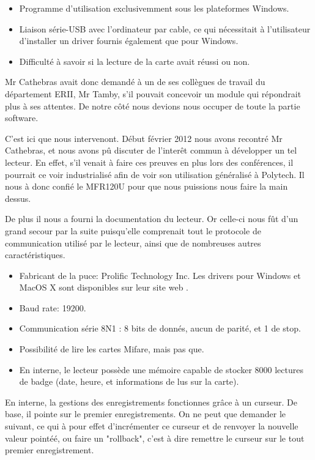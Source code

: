     \begin{itemize}
        \item Programme d'utilisation exclusivemment sous les plateformes Windows.
        \item Liaison série-USB avec l'ordinateur par cable, ce qui nécessitait 
              à l'utilisateur d'installer un driver fournis également que pour
              Windows.
        \item Difficulté à savoir si la lecture de la carte avait réussi ou non.
    \end{itemize}

    Mr Cathebras avait donc demandé à un de ses collègues de travail du département
ERII, Mr Tamby, s'il pouvait concevoir un module qui répondrait plus à ses attentes.
De notre côté nous devions nous occuper de toute la partie software.

    C'est ici que nous intervenont. Début février 2012 nous avons recontré Mr Cathebras,
et nous avons pû discuter de l'interêt commun à développer un tel lecteur. En effet,
s'il venait à faire ces preuves en plus lors des conférences, il pourrait ce voir
industrialisé afin de voir son utilisation généralisé à Polytech. Il nous à donc
confié le MFR120U pour que nous puissions nous faire la main dessus.


    De plus il nous a fourni la documentation du lecteur. Or celle-ci nous fût d'un
grand secour par la suite puisqu'elle comprenait tout le protocole de communication
utilisé par le lecteur, ainsi que de nombreuses autres caractéristiques.

    \begin{itemize}
        \item Fabricant de la puce: Prolific Technology Inc. Les drivers pour Windows
              et MacOS X sont disponibles sur leur site web \cite{prolific}.
        \item Baud rate: 19200.
        \item Communication série 8N1 : 8 bits de donnés, aucun de parité, et 1 de stop.
        \item Possibilité de lire les cartes Mifare, mais pas que.
        \item En interne, le lecteur possède une mémoire capable de stocker 8000
              lectures de badge (date, heure, et informations de lus sur la carte).
    \end{itemize}

    En interne, la gestions des enregistrements fonctionnes grâce à un curseur.
De base, il pointe sur le premier enregistrements. On ne peut que demander le suivant,
ce qui à pour effet d'incrémenter ce curseur et de renvoyer la nouvelle valeur
pointéé, ou faire un "rollback", c'est à dire remettre le curseur sur le tout
premier enregistrement.

